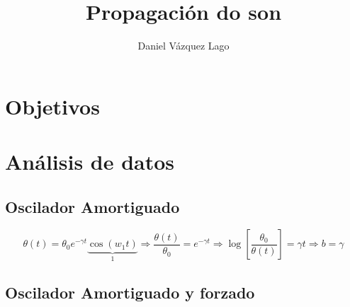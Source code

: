 \documentclass[12pt,a4paper]{article}
\author{Daniel Vázquez Lago}
\title{Propagación do son}
\begin{document}
\maketitle

\newpage

\tableofcontents

\newpage

\section{Objetivos}

\section{Análisis de datos}
\subsection{Oscilador Amortiguado}

\begin{equation}
\theta (t) = \theta_0 e^{-\gamma t} \underbrace{\cos (w_1 t)}_{1} \Longrightarrow \dfrac{\theta(t)}{\theta_0} = e^{-\gamma t } \Longrightarrow \log \left[ \dfrac{\theta_0}{\theta (t)} \right] = \gamma t  \Longrightarrow b  = \gamma
\end{equation}

\subsection{Oscilador Amortiguado y forzado}
\end{document}
